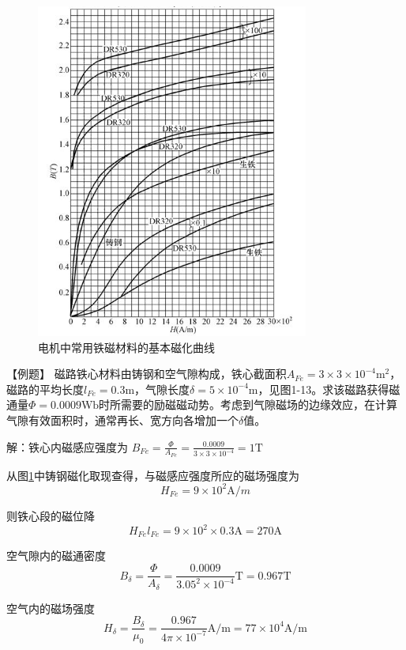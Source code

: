 \documentclass{book}
\begin{document}
\begin{figure}[H]
	\centering
	\includegraphics[width=0.80\textwidth]{cihuaquxian.png}
	\caption{电机中常用铁磁材料的基本磁化曲线}
	\label{fig_cihuaquxian}
\end{figure}

【例题】 磁路铁心材料由铸钢和空气隙构成，铁心截面积${{A}_{Fe}}=3\times 3\times {{10}^{-4}}{{\text{m}}^{2}}$，磁路的平均长度${{l}_{Fe}}=0.3\text{m}$，气隙长度$\delta =5\times {{10}^{-4}}\text{m}$，见图1-13。求该磁路获得磁通量$\Phi =0.0009\text{Wb}$时所需要的励磁磁动势。考虑到气隙磁场的边缘效应，在计算气隙有效面积时，通常再长、宽方向各增加一个$\delta $值。

解：铁心内磁感应强度为
${{B}_{Fe}}=\frac{\Phi }{{{A}_{Fe}}}=\frac{0.0009}{3\times 3\times {{10}^{-4}}}=1\text{T}$

从图\ref{fig_cihuaquxian}中铸钢磁化取现查得，与磁感应强度所应的磁场强度为
\[{{H}_{Fe}}=9\times {{10}^{2}}\text{A}/m\]

则铁心段的磁位降 \[{{H}_{Fe}}{{l}_{Fe}}=9\times {{10}^{2}}\times 0.3\text{A}=270\text{A}\]

空气隙内的磁通密度 \[{{B}_{\delta }}=\frac{\Phi }{{{A}_{\delta }}}=\frac{0.0009}{{{3.05}^{2}}\times {{10}^{-4}}}\text{T}=0.967\text{T}\]

空气内的磁场强度 \[{{H}_{\delta }}=\frac{{{B}_{\delta }}}{{{\mu }_{0}}}=\frac{0.967}{4\pi \times {{10}^{-7}}}\text{A/m}=77\times {{10}^{4}}\text{A/m}\]
\end{document}
